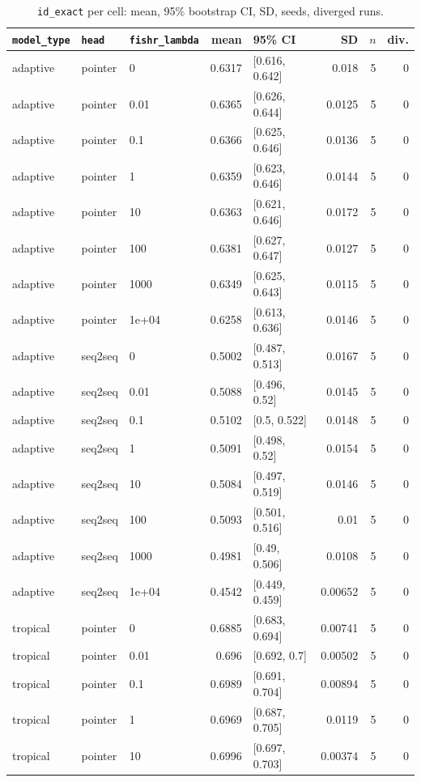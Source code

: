 \documentclass[10pt]{article}
\begin{document}
{\small
\begin{longtable}{lllrlrrr}
\caption{\texttt{id\_exact} per cell: mean, 95\% bootstrap CI, SD, seeds, diverged runs.}\label{tab:summary-id_exact}\\
\toprule
\texttt{model\_type} & \texttt{head} & \texttt{fishr\_lambda} & mean & 95\% CI & SD & $n$ & div.\\
\midrule
\endhead
adaptive & pointer & 0 & 0.6317 & [0.616, 0.642] & 0.018 & 5 & 0\\
adaptive & pointer & 0.01 & 0.6365 & [0.626, 0.644] & 0.0125 & 5 & 0\\
adaptive & pointer & 0.1 & 0.6366 & [0.625, 0.646] & 0.0136 & 5 & 0\\
adaptive & pointer & 1 & 0.6359 & [0.623, 0.646] & 0.0144 & 5 & 0\\
adaptive & pointer & 10 & 0.6363 & [0.621, 0.646] & 0.0172 & 5 & 0\\
adaptive & pointer & 100 & 0.6381 & [0.627, 0.647] & 0.0127 & 5 & 0\\
adaptive & pointer & 1000 & 0.6349 & [0.625, 0.643] & 0.0115 & 5 & 0\\
adaptive & pointer & 1e+04 & 0.6258 & [0.613, 0.636] & 0.0146 & 5 & 0\\
adaptive & seq2seq & 0 & 0.5002 & [0.487, 0.513] & 0.0167 & 5 & 0\\
adaptive & seq2seq & 0.01 & 0.5088 & [0.496, 0.52] & 0.0145 & 5 & 0\\
adaptive & seq2seq & 0.1 & 0.5102 & [0.5, 0.522] & 0.0148 & 5 & 0\\
adaptive & seq2seq & 1 & 0.5091 & [0.498, 0.52] & 0.0154 & 5 & 0\\
adaptive & seq2seq & 10 & 0.5084 & [0.497, 0.519] & 0.0146 & 5 & 0\\
adaptive & seq2seq & 100 & 0.5093 & [0.501, 0.516] & 0.01 & 5 & 0\\
adaptive & seq2seq & 1000 & 0.4981 & [0.49, 0.506] & 0.0108 & 5 & 0\\
adaptive & seq2seq & 1e+04 & 0.4542 & [0.449, 0.459] & 0.00652 & 5 & 0\\
tropical & pointer & 0 & 0.6885 & [0.683, 0.694] & 0.00741 & 5 & 0\\
tropical & pointer & 0.01 & 0.696 & [0.692, 0.7] & 0.00502 & 5 & 0\\
tropical & pointer & 0.1 & 0.6989 & [0.691, 0.704] & 0.00894 & 5 & 0\\
tropical & pointer & 1 & 0.6969 & [0.687, 0.705] & 0.0119 & 5 & 0\\
tropical & pointer & 10 & 0.6996 & [0.697, 0.703] & 0.00374 & 5 & 0\\

\end{longtable}}
\end{document}
